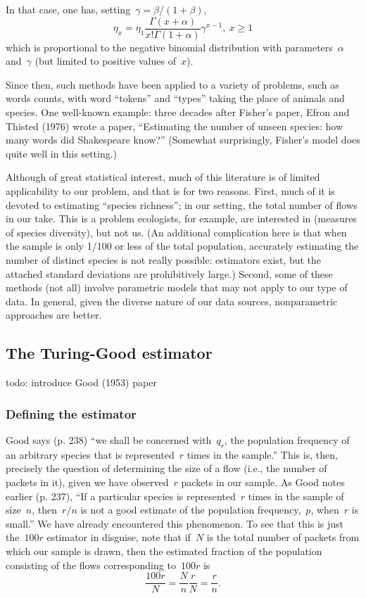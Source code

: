 \documentclass{paper}
\begin{document}
In that case, one has, setting~$\gamma = \beta/(1+\beta)$,
$$ \eta_x = \eta_1 \frac{\Gamma(x + \alpha)}{x!\Gamma(1+\alpha)}\gamma^{x-1},~x \geq 1 $$
which is proportional to the negative binomial distribution with
parameters~$\alpha$ and~$\gamma$ (but limited to positive values of~$x$).

Since then, such methods have been applied to a variety of problems, such as
words counts, with word ``tokens'' and ``types'' taking the place of animals and
species. One well-known example: three decades after Fisher's paper, Efron and
Thisted (1976) wrote a paper, ``Estimating the number of unseen species: how
many words did Shakespeare know?'' (Somewhat surprisingly, Fisher's model does
quite well in this setting.)

Although of great statistical interest, much of this literature is of limited
applicability to our problem, and that is for two reasons. First, much of it is
devoted to estimating ``species richness''; in our setting, the total number of
flows in our take. This is a problem ecologists, for example, are interested in
(measures of species diversity), but not us. (An additional complication here is
that when the sample is only 1/100 or less of the total population, accurately
estimating the number of distinct species is not really possible: estimators
exist, but the attached standard deviations are prohibitively large.) Second,
some of these methods (not all) involve parametric models that may not apply to
our type of data. In general, given the diverse nature of our data sources,
nonparametric approaches are better.

\subsection{The Turing-Good estimator}

todo: introduce Good (1953) paper

\subsubsection{Defining the estimator}\label{def_tg}

Good says (p. 238) ``we shall be concerned with~$q_r$, the population frequency
of an arbitrary species that is represented~$r$ times in the sample.'' This is,
then, precisely the question of determining the size of a flow (i.e., the number
of packets in it), given we have observed~$r$ packets in our sample. As Good
notes earlier (p. 237), ``If a particular species is represented~$r$ times in
the sample of size~$n$, then~$r/n$ is not a good estimate of the population
frequency,~$p$, when~$r$ is small.'' We have already encountered this
phenomenon. To see that this is just the~$100r$ estimator in disguise, note that
if~$N$ is the total number of packets from which our sample is drawn, then the
estimated fraction of the population consisting of the flows corresponding
to~$100r$ is $$ \frac{100r}{N} = \frac{N}{n}\frac{r}{N} = \frac{r}{n}. $$
\end{document}
